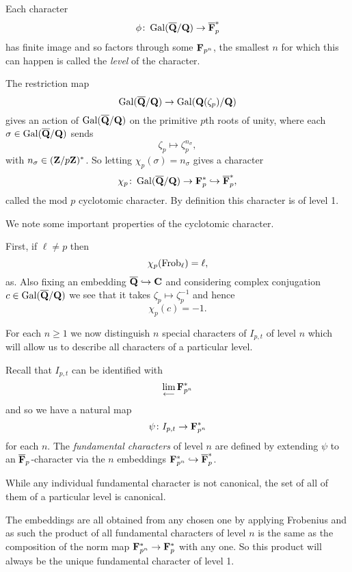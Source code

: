 \documentclass[a4paper,12pt]{article}
\begin{document}
\begin{defn}
Each character
\[
\phi \colon \operatorname{Gal}(\overline{\mathbf{Q}}/\mathbf{Q}) \to \overline{\mathbf{F}}_p^*
\]
has finite image and so factors through some $\mathbf{F}_{p^n}$, the smallest $n$ for which this can happen is called the \emph{level} of the character.
\end{defn}

\begin{defn}
The restriction map
\[
\operatorname{Gal}(\overline{\mathbf{Q}}/\mathbf{Q}) \to \operatorname{Gal}(\mathbf{Q}(\zeta_p)/\mathbf{Q})
\]
gives an action of $\operatorname{Gal}(\overline{\mathbf{Q}}/\mathbf{Q})$ on the primitive $p$th roots of unity, where each $\sigma\in\operatorname{Gal}(\overline{\mathbf{Q}}/\mathbf{Q})$ sends
\[
\zeta_p\mapsto \zeta_p^{n_\sigma},
\]
with $n_\sigma \in (\mathbf{Z}/p\mathbf{Z})^*$.
So letting $\chi_p(\sigma) = n_\sigma$ gives a character
\[
\chi_p\colon\operatorname{Gal}(\overline{\mathbf{Q}}/\mathbf{Q}) \to\mathbf{F}_p^*\hookrightarrow\overline{\mathbf{F}}_p^*,
\]
called the mod $p$ cyclotomic character.
By definition this character is of level 1.
\end{defn}

\begin{rmk}
We note some important properties of the cyclotomic character.

First, if $\ell \ne p$ then
\[
\chi_p(\operatorname{Frob}_\ell) = \ell,
\]
as.
Also fixing an embedding $\overline{\mathbf{Q}}\hookrightarrow\mathbf{C}$ and considering complex conjugation $c\in\operatorname{Gal}(\overline{\mathbf{Q}}/\mathbf{Q})$ we see that it takes $\zeta_p \mapsto\zeta_p^{-1}$ and hence
\[
\chi_p(c) = -1.
\]
\end{rmk}

For each $n \ge 1$ we now distinguish $n$ special characters of $I_{p,t}$ of level $n$ which will allow us to describe all characters of a particular level.

\begin{defn}\label{def:fund}
Recall that $I_{p,t}$ can be identified with
\[
\lim_{\longleftarrow} \mathbf{F}_{p^n}^*
\]
and so we have a natural map
\[
\psi\colon I_{p,t} \to \mathbf{F}_{p^n}^*
\]
for each $n$.
The \emph{fundamental characters} of level $n$ are defined by extending $\psi$ to an $\overline{\mathbf{F}}_p$-character via the $n$ embeddings $\mathbf{F}_{p^n}^* \hookrightarrow \overline{\mathbf{F}}_p^*$. %

While any individual fundamental character is not canonical, the set of all of them of a particular level is canonical. %
\end{defn}

\begin{rmk}\label{rmk:prodchar}
The embeddings are all obtained from any chosen one by applying Frobenius and as such the product of all fundamental characters of level $n$ is the same as the composition of the norm map $\mathbf{F}_{p^n}^* \to \mathbf{F}_p^*$ with any one.
So this product will always be the unique fundamental character of level 1.
\end{rmk}
\end{document}
